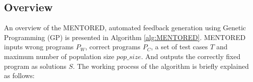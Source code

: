 \documentclass[10pt,conference]{IEEEtran}
\begin{document}
    \subsection{Overview}
        An overview of the MENTORED, automated feedback generation using Genetic Programming (GP) is presented in Algorithm \ref{alg:MENTORED}. MENTORED inputs wrong programs $P_{W}$, correct programs $P_{C}$, a set of test cases $T$ and maximum number of population size $pop\_size$. And outputs the correctly fixed program as solutions $S$. The working process of the algorithm is briefly explained as follows:

\end{document}
